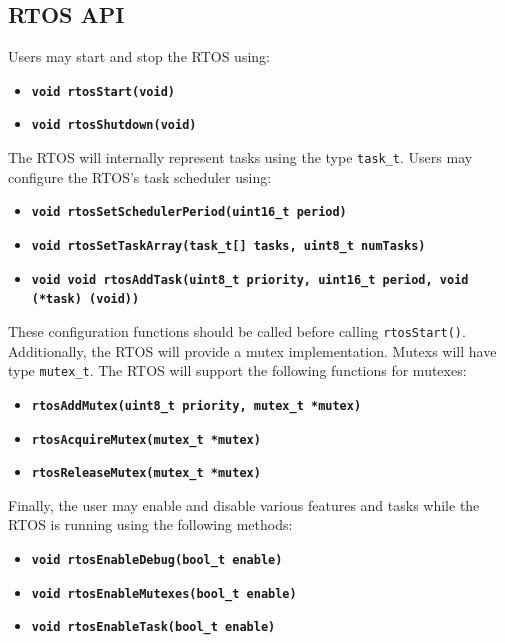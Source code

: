 \documentclass{article}
\newcommand{\bitem}[1]{\item \textbf{#1}}
\begin{document}
    \subsection*{RTOS API}
        
        Users may start and stop the RTOS using:
        \begin{itemize}
            \bitem{\texttt{void rtosStart(void)}}
            \bitem{\texttt{void rtosShutdown(void)}}
        \end{itemize}

        The RTOS will internally represent tasks using the type \texttt{task\_t}. Users may configure the RTOS's task scheduler using:
        \begin{itemize}
            \bitem{\texttt{void rtosSetSchedulerPeriod(uint16\_t period)}}
            \bitem{\texttt{void rtosSetTaskArray(task\_t[] tasks, uint8\_t numTasks)}}
            \bitem{\texttt{void void rtosAddTask(uint8\_t priority, uint16\_t period, void (*task) (void))}}
        \end{itemize}
        These configuration functions should be called before calling \texttt{rtosStart()}. \\


        Additionally, the RTOS will provide a mutex implementation. Mutexs will have type \texttt{mutex\_t}. The RTOS will support the following functions for mutexes:
        \begin{itemize}
            \bitem{\texttt{rtosAddMutex(uint8\_t priority, mutex\_t *mutex)}}
            \bitem{\texttt{rtosAcquireMutex(mutex\_t *mutex)}}
            \bitem{\texttt{rtosReleaseMutex(mutex\_t *mutex)}}
        \end{itemize}

        Finally, the user may enable and disable various features and tasks while the RTOS is running using the following methods:
        \begin{itemize}
            \bitem{\texttt{void rtosEnableDebug(bool\_t enable)}}
            \bitem{\texttt{void rtosEnableMutexes(bool\_t enable)}}
            \bitem{\texttt{void rtosEnableTask(bool\_t enable)}}
        \end{itemize}
        
\end{document}
